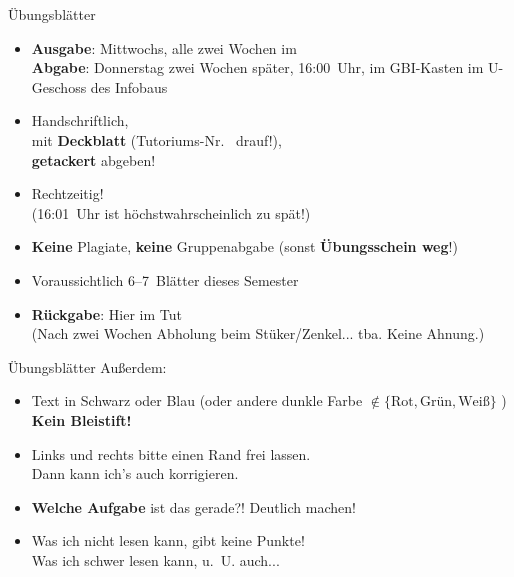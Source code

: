 \begin{frame}{Übungsblätter}
	\begin{itemize}
		\item \textbf{Ausgabe}: Mittwochs, alle zwei Wochen im \ILIAS \\
			  \textbf{Abgabe}: Donnerstag zwei Wochen später, 16:00~Uhr, im GBI-Kasten im U-Geschoss des Infobaus
		\pause
		\item Handschriftlich, \\ 
		mit \textbf{Deckblatt} (Tutoriums-Nr. \mytutnumber\  drauf!), \\ 
		\textbf{getackert} abgeben!
		\item Rechtzeitig! \\(16:01~Uhr ist höchstwahrscheinlich zu spät!)
		\item \textbf{Keine} Plagiate, \textbf{keine} Gruppenabgabe (sonst \textbf{Übungsschein weg}!) 
		\pause
		\item Voraussichtlich 6--7~Blätter dieses Semester
		\item \textbf{Rückgabe}: Hier im Tut \\ (Nach zwei Wochen Abholung beim Stüker/Zenkel... tba. Keine Ahnung.) %
	\end{itemize}
	
\end{frame}

\begin{frame}{Übungsblätter}
	Außerdem:
	\begin{itemize}
		\item Text in Schwarz oder Blau (oder andere dunkle Farbe $\notin \{\text{Rot}, \text{Grün}, \text{Weiß}\}$ ) \\
			  \textbf{Kein Bleistift!}
		\item Links und rechts bitte einen Rand frei lassen. \\
			  Dann kann ich's auch korrigieren. \smiley
		\item \textbf{Welche Aufgabe} ist das gerade?! \impl Deutlich machen!
		\item Was ich nicht lesen kann, gibt keine Punkte! \\
			  \small Was ich schwer lesen kann, u.~U. auch... 
	\end{itemize}
\end{frame}



